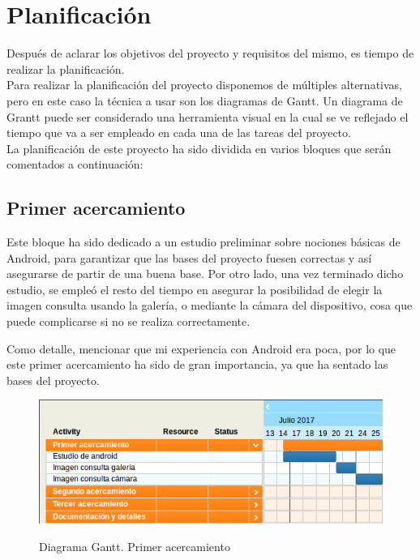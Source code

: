 
\chapter{Planificación}

\label{cap:planificacion}


Después de aclarar los objetivos del proyecto y requisitos del mismo, es tiempo de realizar la planificación.\\

Para realizar la planificación del proyecto disponemos de múltiples alternativas, pero en este caso la técnica a usar son los diagramas de Gantt. Un diagrama de Grantt puede ser considerado una herramienta visual en la cual se ve reflejado el tiempo que va a ser empleado en cada una de las tareas del proyecto.\\

La planificación de este proyecto ha sido dividida en varios bloques que serán comentados a continuación:

\section{Primer acercamiento}

Este bloque ha sido dedicado a un estudio preliminar sobre nociones básicas de Android, para garantizar que las bases del proyecto fuesen correctas y así asegurarse de partir de una buena base. Por otro lado, una vez terminado dicho estudio, se empleó el resto del tiempo en asegurar la posibilidad de elegir la imagen consulta usando la galería, o mediante la cámara del dispositivo, cosa que puede complicarse si no se realiza correctamente.

Como detalle, mencionar que mi experiencia con Android era poca, por lo que este primer acercamiento ha sido de gran importancia, ya que ha sentado las bases del proyecto.

\begin{figure}[H] %
\centering
\includegraphics[scale=0.5]{imagenes/gant1.png}  %
\label{gant1.png}
\caption{Diagrama Gantt. Primer acercamiento}
\end{figure}

